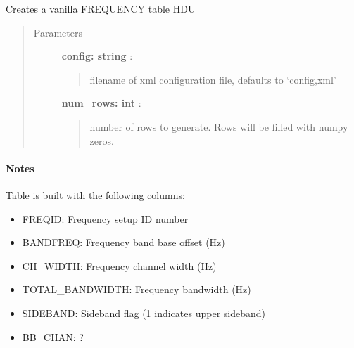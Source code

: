 \documentclass[letterpaper,10pt,english]{sphinxmanual}
\begin{document}

\begin{fulllineitems}
\label{index:pyFitsidi.make_frequency}
Creates a vanilla FREQUENCY table HDU
\begin{quote}\begin{description}
\item[{Parameters }] \leavevmode
\textbf{config: string} :
\begin{quote}

filename of xml configuration file, defaults to `config,xml'
\end{quote}

\textbf{num\_rows: int} :
\begin{quote}

number of rows to generate. Rows will be filled with numpy zeros.
\end{quote}

\end{description}\end{quote}
\paragraph{Notes}

Table is built with the following columns:
\begin{itemize}
\item {} 
FREQID:   Frequency setup ID number

\item {} 
BANDFREQ: Frequency band base offset (Hz)

\item {} 
CH\_WIDTH: Frequency channel width (Hz)

\item {} 
TOTAL\_BANDWIDTH: Frequency bandwidth (Hz)

\item {} 
SIDEBAND: Sideband flag (1 indicates upper sideband)

\item {} 
BB\_CHAN:  ?

\end{itemize}

\end{fulllineitems}


\end{document}
